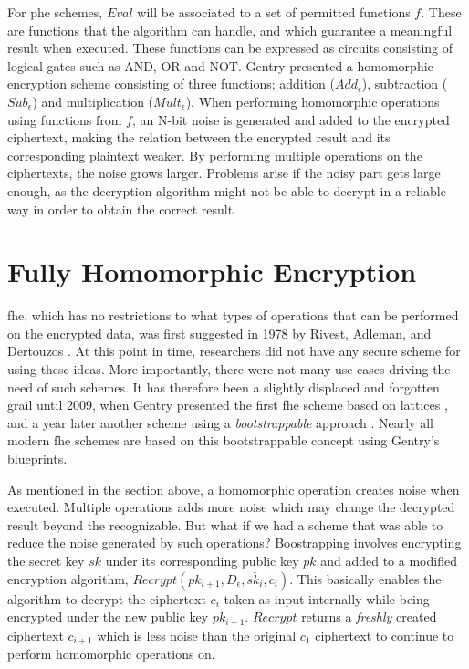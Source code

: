 For \gls{phe} schemes, $Eval$ will be associated to a set of permitted functions $f$. These are functions that the algorithm can handle, and which guarantee a meaningful result when executed. These functions can be expressed as circuits consisting of logical gates such as AND, OR and NOT. Gentry \cite{Gentry_computing_arb_func_enc_data} presented a homomorphic encryption scheme consisting of three functions; addition ($Add_{\epsilon}$), subtraction ($Sub_{\epsilon}$) and multiplication ($Mult_{\epsilon}$). When performing homomorphic operations using functions from $f$, an N-bit noise is generated and added to the encrypted ciphertext, making the relation between the encrypted result and its corresponding plaintext weaker. By performing multiple operations on the ciphertexts, the noise grows larger. Problems arise if the noisy part gets large enough, as the decryption algorithm might not be able to decrypt in a reliable way in order to obtain the correct result.

\section{Fully Homomorphic Encryption}

\Gls{fhe}, which has no restrictions to what types of operations that can be performed on the encrypted data, was first suggested in 1978 by Rivest, Adleman, and Dertouzos \cite{rivest1978data}. At this point in time, researchers did not have any secure scheme for using these ideas. More importantly, there were not many use cases driving the need of such schemes. It has therefore been a slightly displaced and forgotten grail until 2009,
when Gentry presented the first \gls{fhe} scheme based on lattices \cite{Gentry_first_lattices}, and a year later another scheme using a \emph{bootstrappable} approach \citep{Gentry_computing_arb_func_enc_data}. Nearly all modern \gls{fhe} schemes are based on this bootstrappable concept using Gentry's blueprints. 

As mentioned in the section above, a homomorphic operation creates noise when executed. Multiple operations adds more noise which may change the decrypted result beyond the recognizable. But what if we had a scheme that was able to reduce the noise generated by such operations? Boostrapping involves encrypting the secret key $sk$ under its corresponding public key $pk$ and added to a modified encryption algorithm, $Recrypt(pk_{i+1}, D_{\epsilon}, \overline{sk_i}, c_i)$. This basically enables the algorithm to decrypt the ciphertext $c_i$ taken as input internally while being encrypted under the new public key $pk_{i+1}$. $Recrypt$ returns a \emph{freshly} created ciphertext $c_{i+1}$ which is less noise than the original $c_1$ ciphertext to continue to perform homomorphic operations on.


